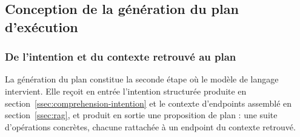 
\subsection{Conception de la génération du plan d'exécution}
\label{ssec:generation-plan}

\subsubsection{De l'intention et du contexte retrouvé au plan}

La génération du plan constitue la seconde étape où le modèle de langage intervient. Elle reçoit en entrée l'intention structurée produite en section~\ref{ssec:comprehension-intention} et le contexte d'endpoints assemblé en section~\ref{ssec:rag}, et produit en sortie une proposition de plan : une suite d'opérations concrètes, chacune rattachée à un endpoint du contexte retrouvé.

